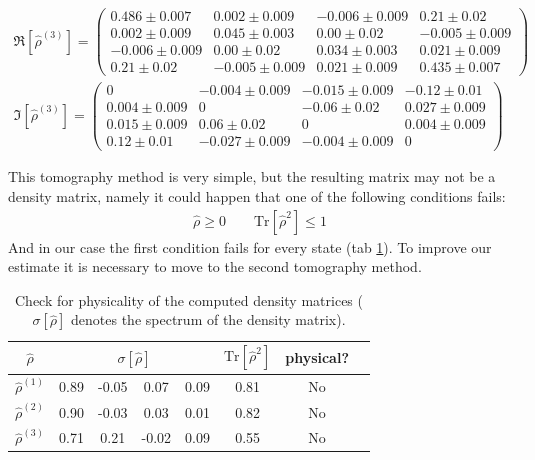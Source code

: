 \documentclass[a4paper, 11pt]{article}
\begin{document}
\begin{gather*}
        \\
        \Re[\hat{\rho}^{(3)}] =
        \begin{pmatrix}
          0.486 \pm 0.007 & 0.002 \pm 0.009 & -0.006 \pm 0.009 & 0.21 \pm 0.02 \\
          0.002 \pm 0.009 & 0.045 \pm 0.003 & 0.00 \pm 0.02 & -0.005 \pm 0.009 \\
          -0.006 \pm 0.009 & 0.00 \pm 0.02 & 0.034 \pm 0.003 & 0.021 \pm 0.009 \\
          0.21 \pm 0.02 & -0.005 \pm 0.009 & 0.021 \pm 0.009 & 0.435 \pm 0.007
        \end{pmatrix}
        \\
        \Im[\hat{\rho}^{(3)}] =
        \begin{pmatrix}
          0 & -0.004 \pm 0.009 & -0.015 \pm 0.009 & -0.12 \pm 0.01 \\
          0.004 \pm 0.009 & 0 & -0.06 \pm 0.02 & 0.027 \pm 0.009 \\
          0.015 \pm 0.009 & 0.06 \pm 0.02 & 0 & 0.004 \pm 0.009 \\
          0.12 \pm 0.01 & -0.027 \pm 0.009 & -0.004 \pm 0.009 & 0
        \end{pmatrix}
      \end{gather*}

      This tomography method is very simple, but the resulting matrix may not be a density matrix, namely it could happen that one of the following conditions fails:
      \begin{gather*}
        \hat{\rho} \ge 0 \qquad \text{Tr}[\hat{\rho}^2] \le 1
      \end{gather*}
      And in our case the first condition fails for every state (tab \ref{tab:tomo_phys}). To improve our estimate it is necessary to move to the second tomography method.

      \begin{table}[H]
        \centering
        \begin{tabular}{cccccccc}
          \toprule
          $\hat{\rho}$ & \multicolumn{4}{c}{$\sigma[\hat{\rho}]$} & $\text{Tr}[\hat{\rho}^2]$ & physical? \\
          \midrule
          $\hat{\rho}^{(1)}$ & 0.89 & -0.05 & 0.07 & 0.09 & 0.81 & No \\
          $\hat{\rho}^{(2)}$ & 0.90 & -0.03 & 0.03 & 0.01 & 0.82 & No \\
          $\hat{\rho}^{(3)}$ & 0.71 & 0.21 & -0.02 & 0.09 & 0.55 & No \\
          \bottomrule
        \end{tabular}
        \caption{Check for physicality of the computed density matrices ($\sigma[\hat{\rho}]$ denotes the spectrum of the density matrix).}
        \label{tab:tomo_phys}
      \end{table}
\end{document}
